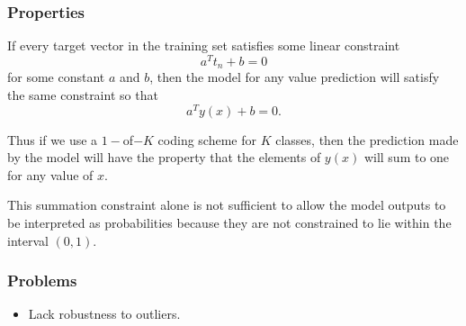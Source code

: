 \begin{frame}
    \frametitle{Properties}

    If every target vector in the training set satisfies some linear constraint
    \begin{equation}
        a^T t_n + b = 0
    \end{equation}
for some constant $a$ and $b$, then the model for 
any value prediction will satisfy the same constraint 
so that 
\begin{equation}
    a^T y(x) + b = 0.
\end{equation}

Thus if we use a $1-$of$-K$ coding scheme for $K$ classes, 
then the prediction made by the model will 
have the property that the elements of $y(x)$
will sum to one for any value of $x$. 

This summation constraint alone is not sufficient to 
allow the model outputs to be interpreted as 
probabilities because they are not constrained to lie
within the interval $(0,1)$. 
\end{frame}

\begin{frame}
    \frametitle{Problems}
\begin{itemize}
    \item Lack robustness to outliers. 
\end{itemize}
    

\end{frame}